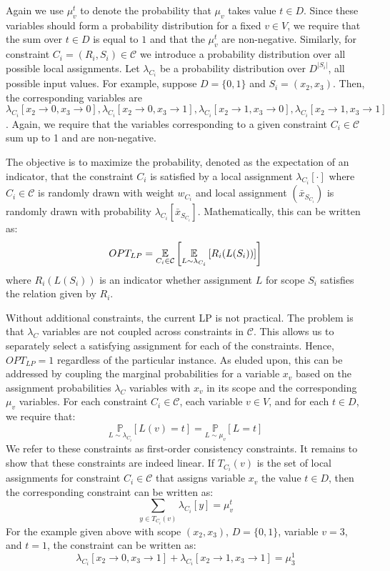 Again we use $\mu_v^t$ to denote the probability that $\mu_v$ takes value $t \in D$. 
Since these variables should form a probability distribution for a fixed $v \in V$, we require that the sum over $t \in D$ is equal to $1$ and that the $\mu_v^t$ are non-negative.
Similarly, for constraint $C_i = (R_i, S_i) \in \mathcal{C}$ we introduce a probability distribution over all possible local assignments.
Let $\lambda_{C_i}$ be a probability distribution over $D^{|S_i|}$, all possible input values.
For example, suppose $D = \{0,1\}$ and $S_i = (x_2,x_3)$. 
Then, the corresponding variables are $\lambda_{C_i}[x_2 \rightarrow 0, x_3 \rightarrow 0], \lambda_{C_i}[x_2 \rightarrow 0, x_3 \rightarrow 1], \lambda_{C_i}[x_2 \rightarrow 1, x_3 \rightarrow 0], \lambda_{C_i}[x_2 \rightarrow 1, x_3 \rightarrow 1]$. Again, we require that the variables corresponding to a given constraint $C_i \in \mathcal{C}$ sum up to 1 and are non-negative.

The objective is to maximize the probability, denoted as the expectation of an indicator, that the constraint $C_i$ is satisfied by a local assignment $\lambda_{C_i}[\cdot]$ where $C_i \in \mathcal{C}$ is randomly drawn with weight $w_{C_i}$ and local assignment $(\bar{x}_{S_{C_i}})$ is randomly drawn with probability $\lambda_{C_i}[\bar{x}_{S_{C_i}}]$. 
Mathematically, this can be written as:
\[
	OPT_{LP} = \underset{C_i \in \mathcal{C}}{\mathbb{E}} \left[ \underset{L \sim \lambda_{C_i}}{\mathbb{E}} \left[ R_i( L (S_i )) \right] \right]
\]
where $R_i( L (S_i ))$ is an indicator whether assignment $L$ for scope $S_i$ satisfies the relation given by $R_i$.

Without additional constraints, the current LP is not practical. 
The problem is that $\lambda_C$ variables are not coupled across constraints in $\mathcal{C}$. 
This allows us to separately select a satisfying assignment for each of the constraints. 
Hence, $OPT_{LP} = 1$ regardless of the particular instance. 
As eluded upon, this can be addressed by coupling the marginal probabilities for a variable $x_v$ based on the assignment probabilities $\lambda_C$ variables with $x_v$ in its scope and the corresponding $\mu_v$ variables.
For each constraint $C_i \in \mathcal{C}$, each variable $v \in V$, and for each $ t \in D$, we require that:
\[
	\underset{L \sim \lambda_{C_i} }{\mathbb{P}}[ L(v) = t] = \underset{L \sim \mu_v }{\mathbb{P}}[ L = t]
\]
We refer to these constraints as first-order consistency constraints.
It remains to show that these constraints are indeed linear.
If $T_{C_i}(v)$ is the set of local assignments for constraint $C_i \in \mathcal{C}$ that assigns variable $x_v$  the value $t \in D$, then the corresponding constraint can be written as:
\[
	\sum_{y \in T_{C_i}(v)} \lambda_{C_i}[y] = \mu_v^t
\]
For the example given above with scope $(x_2,x_3)$, $D = \{0,1\}$, variable $v = 3$, and $ t = 1$, the constraint can be written as:
\[
	\lambda_{C_i}[x_2 \rightarrow 0, x_3 \rightarrow 1] + \lambda_{C_i}[x_2 \rightarrow 1, x_3 \rightarrow 1] = \mu_3^1
\]

